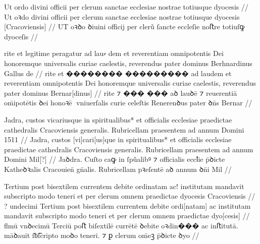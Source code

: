 

\ex \bg
\gla
{} %
Ut ordo divini officii per clerum sanctae ecclesiae  nostrae totiusque 
dyocesis {}
//
\glRekonstrukcja
{}
Ut oꝛdo divini officii per clerum sanctae ecclesiae {} nostrae  totiusque 
dyocesis [Cracoviensis]
//
\glU
{}
UT oꝛꝺo ꝺiuini officij per clerũ ſancte eccleſie {} noﬅre  totiuſꝙ
dyoceſis {}
//
\endgl
\eg

\ex \bg
\gla
{}
rite et legitime peragatur ad {lau⸗  dem} et reverentiam 
omnipotentis Dei honoremque universalis curiae caelestis, reverendus 
pater dominus Berhnardinus Gallus de
//
\glRekonstrukcja
{}
rite et {��������} {���������} ad laudem et reverentiam 
omnipotentis Dei honoremque universalis curiae caelestis, reverendus 
pater dominus Bernar[dinus] {} {}
//
\glU
{}
rite ⁊ {���} {���} aꝺ lauꝺē ⁊ reuerentiā om̄ipotētis ꝺei honoꝛē vniuerſalis curie celeſtis Renerenꝺus pater ꝺn̄s Bernar
//
\endgl
\eg


\ex \bg
\gla
{}
Jadra, custos vicariusque  in spiritualibus* et officialis ecclesiae praedictae cathedralis Cracoviensis 
generalis.
Rubricellam  praesentem ad annum Domini 1511
//
\glRekonstrukcja
{}
Jadra, custos [vi]cari[us]que {} in spiritualibus* et officialis ecclesiae praedictae cathedralis Cracoviensis 
generalis.
Rubricellam  praesentem ad annum Domini Mil[?]
//
\glU
{}
Jaꝺdra. Cuſto caꝙ
{} in ſpũalibꝰ ⁊ oﬀicialis eccꝉie p̄ꝺicte Katheꝺꝛalis Cracouien̄ gn̄alis. Rubricellam  pꝛeſentē aꝺ annum ꝺn̄i Mil
//
\endgl
\eg


\ex \bg
\gla
{}
{} {}  Tertium 
post bisextilem  currentem debite ordinatam ac! institutam mandavit 
subscripto modo teneri et per clerum omnem praedictae dyocesis Cracoviensis
{}
//
\glRekonstrukcja
{}
{?} undecimi  Tertium 
post bisextilem {} currentem debite ordi[natam] ac institutam mandavit 
subscripto modo teneri et per clerum omnem praedictae dyo[cesis]
{}
//
\glU
{}
ﬂmū vnꝺecimū  Terciū poﬅ biſextilē {} currētē ꝺebite oꝛdin��� ac inﬅitutā. māꝺauit ſƀ͡ſcripto moꝺo teneri. ⁊ ꝑ  clerum om̄eꝫ p̄ꝺicte ꝺyo
{}
//
\endgl
\eg



